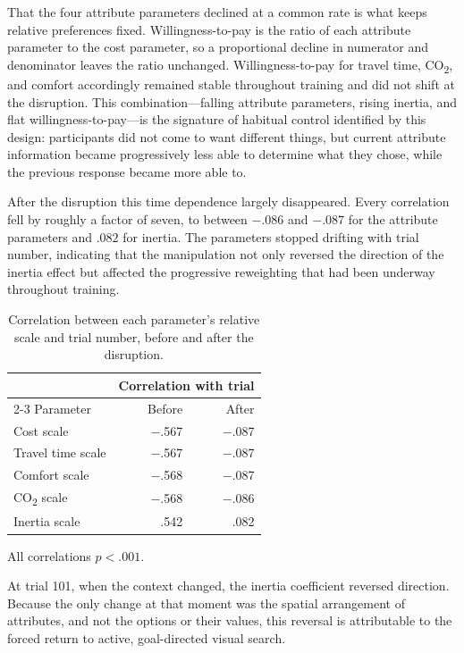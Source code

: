 \documentclass[man,natbib,floatsintext]{apa7}
\begin{document}
That the four attribute parameters declined at a common rate is what keeps relative preferences fixed. Willingness-to-pay is the ratio of each attribute parameter to the cost parameter, so a proportional decline in numerator and denominator leaves the ratio unchanged. Willingness-to-pay for travel time, CO\textsubscript{2}, and comfort accordingly remained stable throughout training and did not shift at the disruption. This combination---falling attribute parameters, rising inertia, and flat willingness-to-pay---is the signature of habitual control identified by this design: participants did not come to want different things, but current attribute information became progressively less able to determine what they chose, while the previous response became more able to.

After the disruption this time dependence largely disappeared. Every correlation fell by roughly a factor of seven, to between $-.086$ and $-.087$ for the attribute parameters and $.082$ for inertia. The parameters stopped drifting with trial number, indicating that the manipulation not only reversed the direction of the inertia effect but affected the progressive reweighting that had been underway throughout training.

\begin{table}[H]
\centering
\caption{Correlation between each parameter's relative scale and trial number, before and after the disruption.}
\label{tab:param-corr}
\begin{tabular}{lrr}
\toprule
 & \multicolumn{2}{c}{Correlation with trial} \\
\cmidrule(lr){2-3}
Parameter & Before & After \\
\midrule
Cost scale    & $-$.567 & $-$.087 \\
Travel time scale & $-$.567 & $-$.087 \\
Comfort scale & $-$.568 & $-$.087 \\
CO\textsubscript{2} scale & $-$.568 & $-$.086 \\
Inertia scale & .542 & .082 \\
\bottomrule
\end{tabular}
\end{table}

\noindent All correlations $p<.001$.

At trial 101, when the context changed, the inertia coefficient reversed direction. Because the only change at that moment was the spatial arrangement of attributes, and not the options or their values, this reversal is attributable to the forced return to active, goal-directed visual search.
\end{document}
